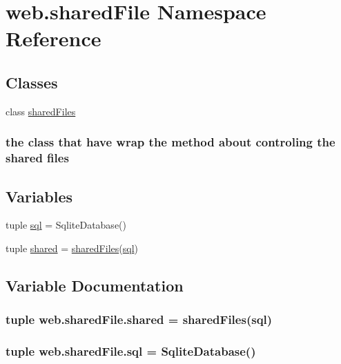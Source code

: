 \hypertarget{namespaceweb_1_1shared_file}{\section{web.\-shared\-File Namespace Reference}
\label{namespaceweb_1_1shared_file}
}
\subsection*{Classes}
\begin{DoxyCompactItemize}
\item 
class \hyperlink{classweb_1_1shared_file_1_1shared_files}{shared\-Files}
\begin{DoxyCompactList}\small\item\em \subsubsection*{the class that have wrap the method about controling the shared files }\end{DoxyCompactList}\end{DoxyCompactItemize}
\subsection*{Variables}
\begin{DoxyCompactItemize}
\item 
tuple \hyperlink{namespaceweb_1_1shared_file_a0c7c5200d908cb509ef1cc0318f3aea9}{sql} = Sqlite\-Database()
\item 
tuple \hyperlink{namespaceweb_1_1shared_file_afec4a04679339f45654e8329facebf81}{shared} = \hyperlink{classweb_1_1shared_file_1_1shared_files}{shared\-Files}(\hyperlink{namespaceweb_1_1shared_file_a0c7c5200d908cb509ef1cc0318f3aea9}{sql})
\end{DoxyCompactItemize}


\subsection{Variable Documentation}
\hypertarget{namespaceweb_1_1shared_file_afec4a04679339f45654e8329facebf81}{
\subsubsection[{shared}]{\setlength{\rightskip}{0pt plus 5cm}tuple web.\-shared\-File.\-shared = {\bf shared\-Files}({\bf sql})}}\label{namespaceweb_1_1shared_file_afec4a04679339f45654e8329facebf81}
\hypertarget{namespaceweb_1_1shared_file_a0c7c5200d908cb509ef1cc0318f3aea9}{
\subsubsection[{sql}]{\setlength{\rightskip}{0pt plus 5cm}tuple web.\-shared\-File.\-sql = Sqlite\-Database()}}\label{namespaceweb_1_1shared_file_a0c7c5200d908cb509ef1cc0318f3aea9}

